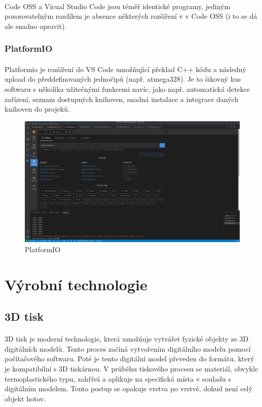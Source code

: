 \documentclass[12pt]{article}
\begin{document}
\begin{spacing}{1.5}
	\paragraph{} Code OSS a Vicual Studio Code jsou téměř identické programy, jediným pozorovatelným rozdílem je absence některých rozšíření v  v Code OSS (i to se dá ale snadno opravit).
	
	\subsubsection*{PlatformIO}
	\paragraph{} Platformio je rozšíření do VS Code umožňující překlad C++ kódu a následný upload do předdefinovaných jednočipů (např. atmega328). Je to šikovný kus softwaru s několika užitečnými funkcemi navíc, jako např. automatická detekce zařízení, seznam dostupných knihoven, snadná instalace a integrace daných knihoven do projeků.
	
	\begin{figure}[H]
		\centering
		\includegraphics[width=\linewidth]{platformio}
		\caption{PlatformIO}
		\label{fig:platformio}
	\end{figure}
	
	\newpage
	\section{Výrobní technologie}
	\subsection{3D tisk}
	\paragraph{} 3D tisk je moderní technologie, která umožňuje vytvářet fyzické objekty ze 3D digitálních modelů. Tento proces začíná vytvořením digitálního modelu pomocí počítačového softwaru. Poté je tento digitální model převeden do formátu, který je kompatibilní s 3D tiskárnou. V průběhu tiskového procesu se materiál, obvykle termoplastického typu, zahřívá a aplikuje na specifická místa v souladu s digitálním modelem. Tento postup se opakuje vrstva po vrstvě, dokud není celý objekt hotov.
	

\end{spacing}
\end{document}
